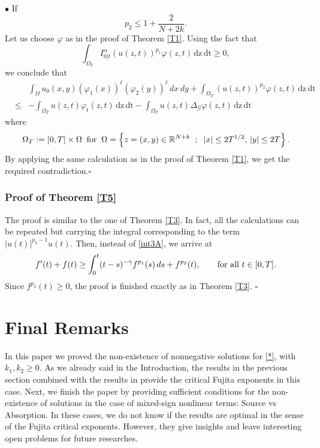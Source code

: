 \documentclass[reqno,11pt]{amsart}
\numberwithin{equation}{section}
\begin{document}
\noindent $\bullet$ If 
$$p_2\leq1+\frac{2}{N+2k}.$$
Let us choose $\varphi$ as in the proof of Theorem \ref{T1}. Using the fact that $$\displaystyle \int_{\Omega_T}I^\alpha_{0|t}(u(z,t))^{p_1}\varphi(z,t)\,\mathrm{dz}\,\mathrm{dt}\geq0,$$ 
we conclude that
\begin{eqnarray*}
	&{}&\int_{\Omega}u_0(x,y)\left(\varphi_1(x)\right)^\ell \left(\varphi_2(y)\right)^\ell\,dx\,dy +  \int_{\Omega_T}(u(z,t))^{p_2}\varphi(z,t)\,\mathrm{dz}\,\mathrm{dt}\\
	&\leq&-\int_{\Omega_T}u(z,t)\varphi_t(z,t)\,\mathrm{dz}\,\mathrm{dt} -\int_{\Omega_T}u(z,t)\Delta_{\mathcal{G}}\varphi(z,t)\,\mathrm{dz}\,\mathrm{dt}
\end{eqnarray*}
where
\[
\Omega_T:=[0,T]\times\Omega\;\;\text{for}\;\; \Omega=\left\{ z=(x,y)\in{\mathbb{R}}^{N+k}\hspace{2
	mm};\hspace{2mm}|x|\leq 2 T^{1/2},\,|y|\leq 2 T\right\}.
\]
By applying the same calculation as in the proof of Theorem \ref{T1}, we get the required contradiction.\hfill$\square$




\subsubsection{Proof of Theorem \ref{T5}}
The proof is similar to the one of Theorem \ref{T3}. In fact, all the calculations can be repeated but carrying the integral corresponding to the term $|u(t)|^{p_2-1}u(t)$. Then, instead of \eqref{int3A}, we arrive at
\begin{equation}\label{int4A}
	f'(t)+f(t)\geq\int_0^t(t-s)^{-\gamma}f^{p_1}(s)\,ds +  f^{p_2}(t) ,\qquad\hbox{for all}\,\,t\in[0,T].
\end{equation}
Since $f^{p_2}(t)\geq0$, the proof is finished exactly as in Theorem \ref{T3}.
\hfill$\square$\\



\section{Final Remarks}


In this paper we proved the non-existence of nonnegative solutions for \eqref{*}, with $k_1,k_2\geq0$. As we already said in the Introduction, the results in the previous section combined with the results in \cite{Fino-Viana-25.1} provide the critical Fujita exponents in this case. Next, we finish the paper by providing sufficient conditions for the non-existence of solutions in the case of mixed-sign nonlinear terms: Source vs Absorption. In these cases, we do not know if the results are optimal in the sense of the Fujita critical exponents. However, they give insights and leave interesting open problems for future researches.
\end{document}
